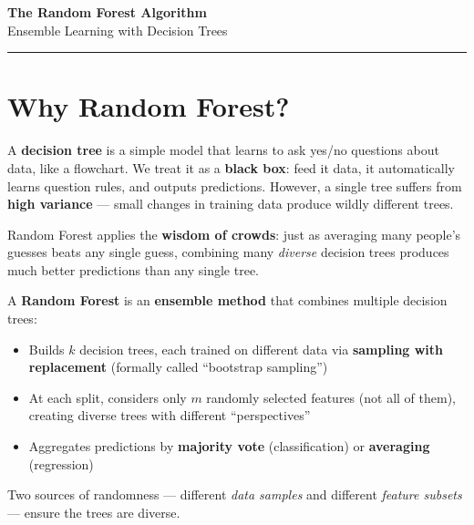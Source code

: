 \documentclass[10pt,a4paper]{article}
\begin{document}
\begin{center}
{\LARGE\bfseries\color{accent} The Random Forest Algorithm}\\[3pt]
{\large\color{slate} Ensemble Learning with Decision Trees}\\[2pt]
{\color{slate!60}\rule{0.4\textwidth}{0.4pt}}
\end{center}

\section{Why Random Forest?}

A \textbf{decision tree} is a simple model that learns to ask yes/no questions about data, like a flowchart. We treat it as a \textbf{black box}: feed it data, it automatically learns question rules, and outputs predictions. However, a single tree suffers from \textbf{high variance} --- small changes in training data produce wildly different trees.

Random Forest applies the \textbf{wisdom of crowds}: just as averaging many people's guesses beats any single guess, combining many \textit{diverse} decision trees produces much better predictions than any single tree.

\begin{defbox}
A \textbf{Random Forest} is an \textbf{ensemble method} that combines multiple decision trees:
\begin{itemize}
  \item Builds $k$ decision trees, each trained on different data via \textbf{sampling with replacement} (formally called ``bootstrap sampling'')
  \item At each split, considers only $m$ randomly selected features (not all of them), creating diverse trees with different ``perspectives''
  \item Aggregates predictions by \textbf{majority vote} (classification) or \textbf{averaging} (regression)
\end{itemize}
Two sources of randomness --- different \textit{data samples} and different \textit{feature subsets} --- ensure the trees are diverse.
\end{defbox}

\vspace{4pt}
\end{document}
